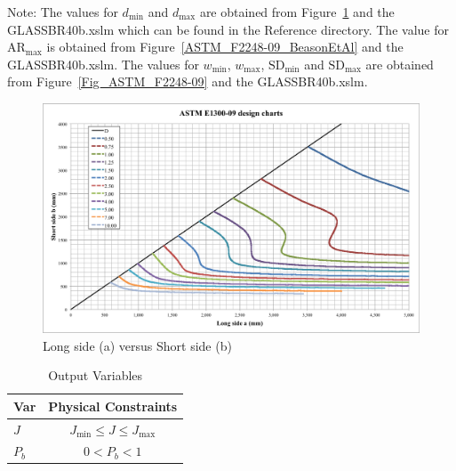 \documentclass[12pt]{article}
\begin{document}
Note: The values for $d_\text{min}$ and $d_\text{max}$ are obtained from Figure~\ref{Fig_ASTM_E1300-09}
and the GLASS\textunderscore BR\textunderscore 40b.xslm which can be found in the 
Reference directory. The value for $\mbox{AR}_\text{max}$ is obtained from Figure~\ref{ASTM_F2248-09_BeasonEtAl}
and the GLASS\textunderscore BR\textunderscore 40b.xslm.
The values for $w_\text{min}$, $w_\text{max}$, $\text{SD}_\text{min}$ and $\text{SD}_\text{max}$
are obtained from Figure~\ref{Fig_ASTM_F2248-09} and the GLASS\textunderscore BR\textunderscore 40b.xslm. 
\newline

\begin{figure}[h!]
  \begin{center}
    \includegraphics[width=\textwidth]{ASTM_E1300-09_design_charts.png}
    \caption{Long side (a) versus Short side (b)}
    \label{Fig_ASTM_E1300-09}
  \end{center}
\end{figure}

\begin{table}[!h]
\caption{Output Variables} \label{TblOutputVar}
\renewcommand{\arraystretch}{1.2}
\begin{center}
\begin{tabular}{l c} 
\toprule
\textbf{Var} & \textbf{Physical Constraints} \\
\midrule 
$J$&$J_{\text{min}} \leq J \leq J_{\text{max}}$\\
$P_b$ & $0 < P_b < 1$\\
\bottomrule
\end{tabular}
\end{center}
\end{table}
  
\end{document}
